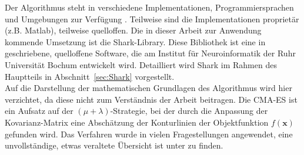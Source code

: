 %
Der Algorithmus steht in verschiedene Implementationen, Programmiersprachen und Umgebungen zur Verfügung \cite{HansenCode}. Teilweise sind die Implementationen proprietär (z.B. Matlab), teilweise quelloffen. Die in dieser Arbeit zur Anwendung kommende Umsetzung ist die Shark-Library. Diese Bibliothek ist eine in \cpp  geschriebene, quelloffene Software, die am Institut für Neuroinformatik der Ruhr Universität Bochum entwickelt wird. Detailliert wird Shark im Rahmen des Hauptteils in Abschnitt~\ref{sec:Shark} vorgestellt.\\

Auf die Darstellung der mathematischen Grundlagen des Algorithmus wird hier verzichtet, da diese nicht zum Verständnis der Arbeit beitragen. Die CMA-ES ist ein Aufsatz auf der $(\mu+\lambda)$-Strategie, bei der durch die Anpassung der Kovarianz-Matrix eine Abschätzung der Konturlinien der Objektfunktion $f(\mathbf{x})$ gefunden wird. Das Verfahren wurde in vielen Fragestellungen angewendet, eine unvollständige, etwas veraltete Übersicht ist unter \cite{CMAESOverview} zu finden.

